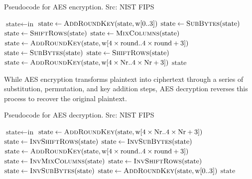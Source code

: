 \documentclass[runningheads]{llncs}
\begin{document}
\begin{algorithm}[hbt!]
\caption{Pseudocode for AES encryption. Src: NIST FIPS~\cite{AES_NIST}}
\begin{algorithmic}[1] %
        \State $\text{state} \gets \text{in}$
        \State $\text{state} \gets \Call{AddRoundKey}{\text{state}, \text{w}[0..3]}$
            \State $\text{state} \gets \Call{SubBytes}{\text{state}}$
            \State $\text{state} \gets \Call{ShiftRows}{\text{state}}$
            \State $\text{state} \gets \Call{MixColumns}{\text{state}}$
            \State $\text{state} \gets \Call{AddRoundKey}{\text{state}, \text{w}[4 \times \text{round}..4 \times \text{round} + 3]}$
        \EndFor
        \State $\text{state} \gets \Call{SubBytes}{\text{state}}$
        \State $\text{state} \gets \Call{ShiftRows}{\text{state}}$
        \State $\text{state} \gets \Call{AddRoundKey}{\text{state}, \text{w}[4 \times \text{Nr}..4 \times \text{Nr} + 3]}$
        \State \Return $\text{state}$
    \EndProcedure
\end{algorithmic}
\label{fig:algo_aes_encrypt}
\end{algorithm}

While AES encryption transforms plaintext into ciphertext through a series of substitution, permutation, and key addition steps, AES decryption reverses this process to recover the original plaintext.

\begin{algorithm}[hbt!]
\caption{Pseudocode for AES decryption. Src: NIST FIPS\cite{AES_NIST}}
\begin{algorithmic}[1] %
        \State $\text{state} \gets \text{in}$
        \State $\text{state} \gets \Call{AddRoundKey}{\text{state}, \text{w}[4 \times \text{Nr}..4 \times \text{Nr} + 3]}$
            \State $\text{state} \gets \Call{InvShiftRows}{\text{state}}$
            \State $\text{state} \gets \Call{InvSubBytes}{\text{state}}$
            \State $\text{state} \gets \Call{AddRoundKey}{\text{state}, \text{w}[4 \times \text{round}..4 \times \text{round} + 3]}$
            \State $\text{state} \gets \Call{InvMixColumns}{\text{state}}$
        \EndFor
        \State $\text{state} \gets \Call{InvShiftRows}{\text{state}}$
        \State $\text{state} \gets \Call{InvSubBytes}{\text{state}}$
        \State $\text{state} \gets \Call{AddRoundKey}{\text{state}, \text{w}[0..3]}$
        \State \Return $\text{state}$
    \EndProcedure
\end{algorithmic}
\label{fig:algo_aes_decrypt}
\end{algorithm}
\end{document}
